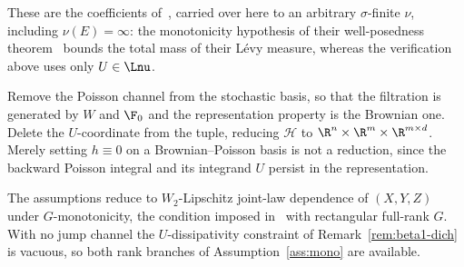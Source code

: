 \begin{example}
These are the coefficients of~\cite[Example~3.1]{LiMin}, carried over here to an
arbitrary $\sigma$-finite $\nu$, including $\nu(E)=\infty$: the monotonicity hypothesis of
their well-posedness theorem~\cite[(H3.2) and Theorem~3.1]{LiMin} bounds the total mass of
their L\'evy measure, whereas the verification above uses only $U\in\Lnu$.

\end{example}

\begin{example}\label{ex:brownian}
Remove the Poisson channel from the stochastic basis, so that the filtration is generated by
$W$ and $\F_0$ and the representation property is the Brownian one. Delete the $U$-coordinate
from the tuple, reducing $\mathcal H$ to $\R^n\times\R^m\times\R^{m\times d}$. Merely setting
$h\equiv0$ on a Brownian--Poisson basis is not a reduction, since the backward Poisson integral
and its integrand $U$ persist in the representation.

The assumptions reduce to $W_2$-Lipschitz joint-law dependence of $(X,Y,Z)$ under
$G$-monotonicity, the condition imposed in~\cite[(A1)]{BYZ} with rectangular full-rank $G$.
With no jump channel the $U$-dissipativity constraint of
Remark~\ref{rem:beta1-dich} is vacuous, so both rank branches of Assumption~\ref{ass:mono}
are available.
\end{example}

